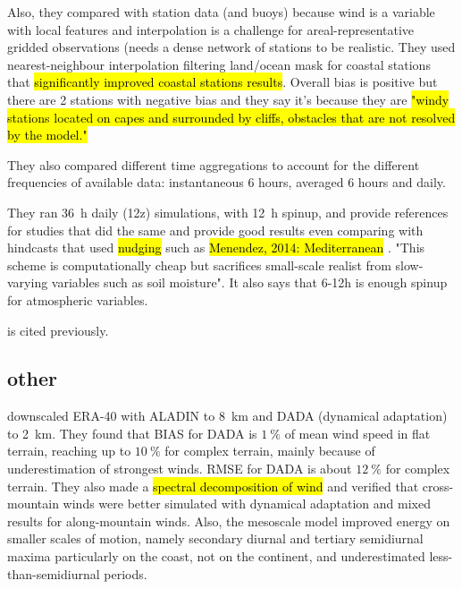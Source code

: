 \documentclass[12pt,a4paper]{article}
\begin{document}
Also, they compared with station data (and buoys) because wind is a variable with local features and interpolation is a challenge for areal-representative gridded observations (needs a dense network of stations to be realistic. They used nearest-neighbour interpolation filtering land/ocean mask for coastal stations that \hl{significantly improved coastal stations results}. Overall bias is positive but there are 2 stations with negative bias and they say it's because they are \hl{"windy stations located on capes and surrounded by cliffs, obstacles that are not resolved by the model."}

They also compared different time aggregations to account for the different frequencies of available data: instantaneous 6 hours, averaged 6 hours and daily.

They ran 36~h daily (12z) simulations, with 12~h spinup, and provide references for studies that did the same and provide good results even comparing with hindcasts that used \hl{nudging} such as \hl{Menendez, 2014: Mediterranean} . "This scheme is computationally cheap but sacrifices small-scale realist from slow-varying variables such as soil moisture".  It also says that 6-12h is enough spinup for atmospheric variables.

\cite{Winterfeldt2009} is cited previously.

\subsection{other}

\cite{Horvath2011} downscaled ERA-40 with ALADIN to 8~km and DADA (dynamical adaptation) to 2~km. They found that BIAS for DADA is $1~\%$ of mean wind speed in flat terrain, reaching up to $10~\%$ for complex terrain, mainly because of underestimation of strongest winds. RMSE for DADA is about $12~\%$ for complex terrain. They also made a \hl{spectral decomposition of wind} and verified that cross-mountain winds were better simulated with dynamical adaptation and mixed results for along-mountain winds. Also, the mesoscale model improved energy on smaller scales of motion, namely secondary diurnal and tertiary semidiurnal maxima particularly on the coast, not on the continent, and underestimated less-than-semidiurnal periods.

\cite{vonStorch2017}


\printglossaries


\label{sec:references}
\end{document}

